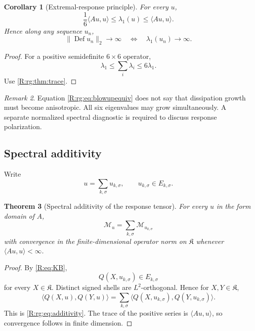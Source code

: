 \documentclass[
 aps,
 prd,
 reprint,
 amsmath,
 amssymb,
 nofootinbib,
 superscriptaddress
]{revtex4-2}
\newtheorem{theorem}{Theorem}[section]
\newtheorem{corollary}[theorem]{Corollary}
\theoremstyle{definition}
\theoremstyle{remark}
\newtheorem{remark}[theorem]{Remark}
\newcommand{\cM}{\mathscr M}
\newcommand{\Def}{\operatorname{Def}}
\begin{document}
\begin{corollary}[Extremal-response principle]
\label{R:rg:cor:extremal}
For every $u$,
\begin{equation}
 \frac{1}{6}\langle Au,u\rangle
 \le
 \lambda_1(u)
 \le
 \langle Au,u\rangle.
 \label{R:rg:eq:lambdabounds}
\end{equation}
Hence along any sequence $u_n$,
\begin{equation}
 \|\Def u_n\|_2\longrightarrow\infty
 \quad\Longleftrightarrow\quad
 \lambda_1(u_n)\longrightarrow\infty.
 \label{R:rg:eq:blowupequiv}
\end{equation}
\end{corollary}

\begin{proof}
For a positive semidefinite $6\times6$ operator,
\[
       \lambda_1
       \le\sum_i\lambda_i
       \le6\lambda_1.
\]
Use \cref{R:rg:thm:trace}.
\end{proof}

\begin{remark}
Equation \eqref{R:rg:eq:blowupequiv} does not say that dissipation growth must
become anisotropic.  All six eigenvalues may grow simultaneously.  A
separate normalized spectral diagnostic is required to discuss response
polarization.
\end{remark}

\subsection{Spectral additivity}

Write
\[
       u=\sum_{k,\sigma}u_{k,\sigma},
       \qquad
       u_{k,\sigma}\in E_{k,\sigma}.
\]

\begin{theorem}[Spectral additivity of the response tensor]
\label{R:rg:thm:additivity}
For every $u$ in the form domain of $A$,
\begin{equation}
 \boxed{
 \cM_u
 =
 \sum_{k,\sigma}
 \cM_{u_{k,\sigma}}
 }
 \label{R:rg:eq:additivity}
\end{equation}
with convergence in the finite-dimensional operator norm on $\mathfrak K$
whenever $\langle Au,u\rangle<\infty$.
\end{theorem}

\begin{proof}
By \eqref{R:eq:KB},
\[
 Q(X,u_{k,\sigma})\in E_{k,\sigma}
\]
for every $X\in\mathfrak K$.  Distinct signed shells are $L^2$-orthogonal.
Hence for $X,Y\in\mathfrak K$,
\[
 \langle Q(X,u),Q(Y,u)\rangle
 =
 \sum_{k,\sigma}
 \langle
 Q(X,u_{k,\sigma}),
 Q(Y,u_{k,\sigma})
 \rangle.
\]
This is \eqref{R:rg:eq:additivity}.  The trace of the positive series is
$\langle Au,u\rangle$, so convergence follows in finite dimension.
\end{proof}
\end{document}

